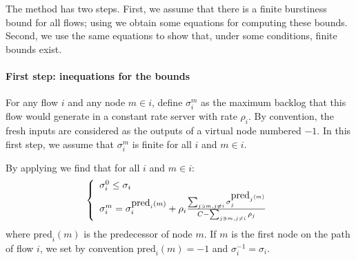The method has two steps. First, we assume that there is a finite
burstiness bound for all flows;  using  we
obtain some equations for computing these bounds. Second, we use
the same equations to show that, under some conditions, finite
bounds exist.

\begin{figure}[!htbp]
\end{figure}

\paragraph{First step: inequations for the bounds}


For any flow $i$ and any node $m \in i$, define $\sigma_i^m$ as
the maximum backlog that this flow would generate in a constant
rate server with rate $\rho_i$. By convention, the fresh inputs
are considered as the outputs of a virtual node numbered $-1$. In
this first step, we assume that $\sigma_i^m$ is finite for all $i$
and $m \in i$.

By applying  we find that for all $i$ and $m \in
i$:
\begin{equation}\mylabel{eq-ds-lin}
\bracket{
 \sigma_i^0 \leq \sigma_i \\
\sigma_i^m = \sigma_i^{\mbox{pred}_i(m)} + \rho_i \frac{
 \sum_{j \ni m, j \neq i}\sigma_j^{\mbox{pred}_j(m)}
 }
 {C-\sum_{j \ni m, j \neq i} \rho_j}
 }
\end{equation}
where $\mbox{pred}_i(m)$ is the predecessor of node $m$. If $m$ is
the first node on the path of flow $i$, we set by convention
$\mbox{pred}_i(m)=-1$ and $\sigma_i^{-1}=\sigma_i$.

